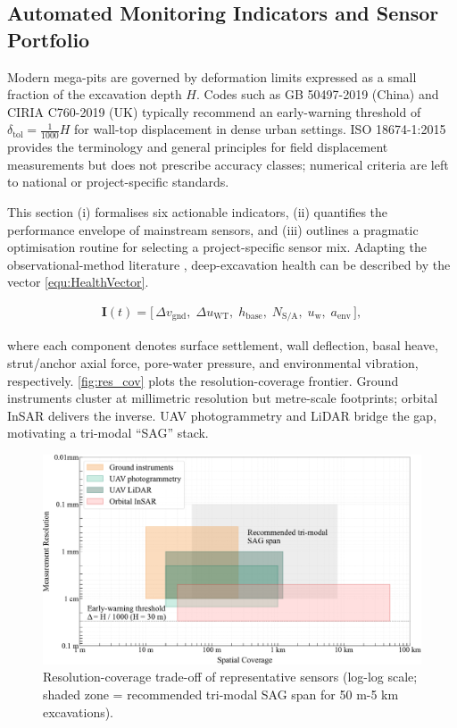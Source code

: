 \documentclass[preprint,11pt,authoryear,3p]{elsarticle}
\begin{document}
\subsection{Automated Monitoring Indicators and Sensor Portfolio}

Modern mega-pits are governed by deformation limits expressed as a small fraction of the excavation depth \(H\).  Codes such as GB 50497-2019 (China) and CIRIA C760-2019 (UK) typically recommend an early-warning threshold of \( \delta_{\mathrm{tol}} = \tfrac{1}{1000}H \) for wall-top displacement in dense urban settings\citep{GB50497:2019,CIRIA760}.  ISO 18674-1:2015 provides the terminology and general principles for field displacement measurements but does not prescribe accuracy classes; numerical criteria are left to national or project-specific standards\citep{ISO18674-1:2015}.

This section (i) formalises six actionable indicators, (ii) quantifies the performance envelope of mainstream sensors, and (iii) outlines a pragmatic optimisation routine for selecting a project-specific sensor mix. Adapting the observational-method literature \citep{Dunnicliff2018}, deep-excavation health can be described by the vector \autoref{equ:HealthVector}.

\begin{align}\label{equ:HealthVector}
      \mathbf{I}(t)=
  \bigl[\,\Delta v_{\text{gnd}},\;
         \Delta u_{\text{WT}},\;
         h_{\text{base}},\;
         N_{\text{S/A}},\;
         u_{\text{w}},\;
         a_{\text{env}}\,\bigr],
\end{align}

where each component denotes surface settlement, wall deflection, basal heave, strut/anchor axial force, pore-water pressure, and environmental vibration, respectively. \autoref{fig:res_cov} plots the resolution-coverage frontier. Ground instruments cluster at millimetric resolution but metre-scale footprints; orbital InSAR delivers the inverse.  UAV photogrammetry and LiDAR bridge the gap, motivating a tri-modal “SAG” stack.

\begin{figure}[htbp]
  \centering
  \includegraphics[width=\linewidth]{imgs/res_cov.pdf}
  \caption{Resolution-coverage trade-off of representative sensors
           (log-log scale; shaded zone = recommended tri-modal SAG span
           for 50 m-5 km excavations).}
  \label{fig:res_cov}
\end{figure}
\end{document}
